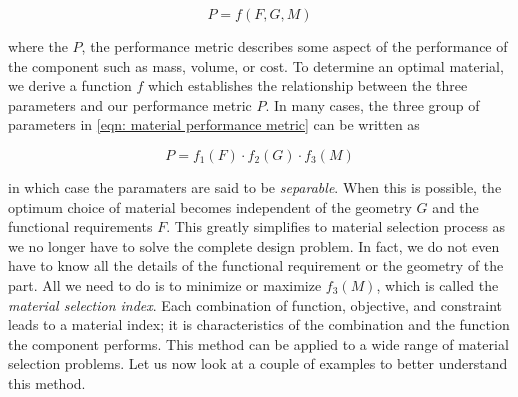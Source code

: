 \documentclass[
10pt,
a4paper,
openany,
svgnames,
]{book}
\begin{document}
\begin{equation}
  \label{eqn: material performance metric}
  P = f \left(F, G, M \right)
\end{equation}

where the $P$, the performance metric describes some aspect of the performance of the component such as mass, volume, or cost. To determine an optimal material, we derive a function $f$ which establishes the relationship between the three parameters and our performance metric $P$. In many cases, the three group of parameters in \cref{eqn: material performance metric} can be written as

\begin{equation}
  \label{eq: separable mat perf metric}
  P = f_1(F) \cdot f_2(G) \cdot f_3(M)
\end{equation}

in which case the paramaters are said to be \emph{separable}. When this is possible, the optimum choice of material becomes independent of the geometry $G$ and the functional requirements $F$. This greatly simplifies to material selection process as we no longer have to solve the complete design problem. In fact, we do not even have to know all the details of the functional requirement or the geometry of the part. All we need to do is to minimize or maximize $f_3(M)$, which is called the \emph{material selection index}. Each combination of function, objective, and constraint leads to a material index; it is characteristics of the combination and the function the component performs. This method can be applied to a wide range of material selection problems. Let us now look at a couple of examples to better understand this method.
\end{document}
